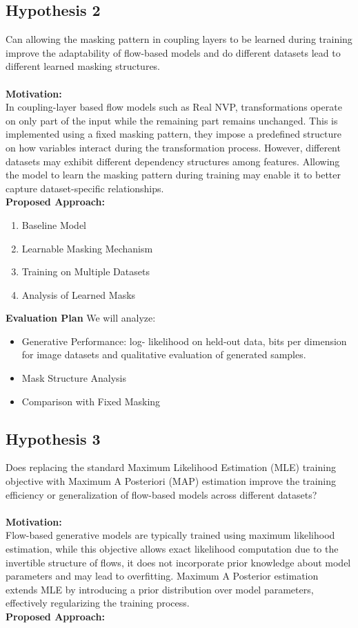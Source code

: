 \documentclass{article}
\begin{document}
\subsection{Hypothesis 2} 
Can allowing the masking pattern in coupling layers to be learned during training improve the adaptability of flow-based models and do different datasets lead to different learned masking structures.\\ \\
\textbf{Motivation:} \\ 
In coupling-layer based flow models such as Real NVP, transformations operate on only part of the input while the remaining part remains unchanged. This is implemented using a fixed masking pattern, they impose a predefined structure on how variables interact during the transformation process. However, different datasets may exhibit different dependency structures among features. Allowing the model to learn the masking pattern during training may enable it to better capture dataset-specific relationships.
 \\ 
\textbf{Proposed Approach:} 
\begin{enumerate}
    \item Baseline Model
    \item Learnable Masking Mechanism
    \item Training on Multiple Datasets
    \item Analysis of Learned Masks
\end{enumerate}
\textbf{Evaluation Plan} 
We will analyze: 
\begin{itemize}
    \item Generative Performance: log- likelihood on held-out data, bits per dimension for image datasets and qualitative evaluation of generated samples.
\item Mask Structure Analysis 
\item Comparison with Fixed Masking
\end{itemize}

\subsection{Hypothesis 3}

Does replacing the standard Maximum Likelihood Estimation (MLE) training objective with Maximum A Posteriori (MAP) estimation improve the training efficiency or generalization of flow-based models across different datasets? \\ \\
\textbf{Motivation:} \\ 
Flow-based generative models are typically trained using maximum likelihood estimation, while this objective allows exact likelihood computation due to the invertible structure of flows, it does not incorporate prior knowledge about model parameters and may lead to overfitting. Maximum A Posterior estimation extends MLE by introducing a prior distribution over model parameters, effectively regularizing the training process. \\ 
\textbf{Proposed Approach:} 
\end{document}
